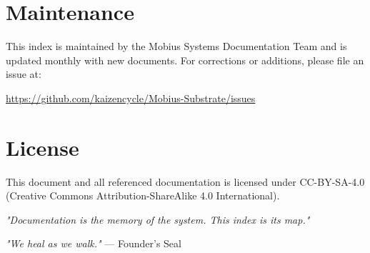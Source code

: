 \documentclass[11pt,a4paper]{article}
\begin{document}
\section{Maintenance}

This index is maintained by the Mobius Systems Documentation Team and is updated monthly with new documents. For corrections or additions, please file an issue at:

\url{https://github.com/kaizencycle/Mobius-Substrate/issues}

\section{License}

This document and all referenced documentation is licensed under CC-BY-SA-4.0 (Creative Commons Attribution-ShareAlike 4.0 International).

\vspace{1cm}

\begin{center}
\textit{"Documentation is the memory of the system. This index is its map."}

\textit{"We heal as we walk."} — Founder's Seal
\end{center}
\end{document}
